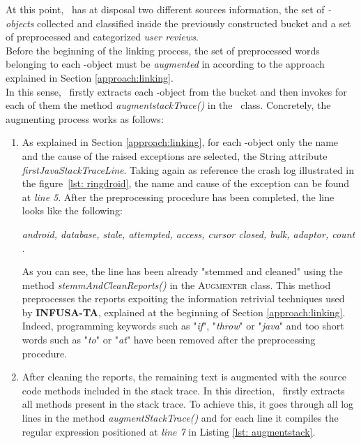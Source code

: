 At this point, \toolname\ has at disposal two different sources information, \ie the set of \textit{\Crash-objects }collected and classified inside the previously constructed bucket and a set of preprocessed and categorized \textit{user reviews}. \\
Before the beginning of the linking process, the set of preprocessed words belonging to each \Crash-object must be \textit{augmented} in according to the approach explained in Section \ref{approach:linking}. \\
In this sense, \toolname\ firstly extracts each \Crash-object from the bucket and then invokes for each of them the method 
\textit{augmentstackTrace()} in the \Crash\ class. 
Concretely, the augmenting process works as follows: 
\begin{enumerate}
\item As explained in Section \ref{approach:linking}, for each \Crash-object only the name and the cause of the raised exceptions are selected, \ie the String attribute \textit{firstJavaStackTraceLine}. Taking again as reference the crash log illustrated in the figure~\ref{lst: ringdroid}, the name and cause of the exception can be found at \textit{line 5}. 
After the preprocessing procedure has been completed, the line looks like the following: 
\begin{center}
\smallbreak
\emph{\small android, database, stale, attempted, access, cursor closed, bulk, adaptor, count }. 
\end{center} 
As you can see, the line has been already "stemmed and cleaned" using the method \textit{stemmAndCleanReports()} in the \textsc{Augmenter} class. 
This method preprocesses the reports expoiting the information retrivial techniques used by \textbf{INFUSA-TA}, explained at the beginning of Section \ref{approach:linking}.
Indeed, programming keywords such as "\textit{if}", "\textit{throw}" or "\textit{java}" and too short words such as "\textit{to}" or "\textit{at}" have been removed after the preprocessing procedure. 
\item After cleaning the reports, the remaining text is augmented with the source code methods included in the stack trace. In this direction, \toolname\ firstly extracts all methods present in the stack trace. To achieve this, it goes through all log lines in the method \textit{augmentStackTrace()} and for each line it compiles the regular expression positioned at \textit{line 7} in Listing \ref{lst: augmentstack}. 
\clearpage
\begin{lstlisting}[caption=Regular expression for extracting all methods from a stack trace,label={lst: augmentstack}]

\end{lstlisting}
\end{enumerate}
